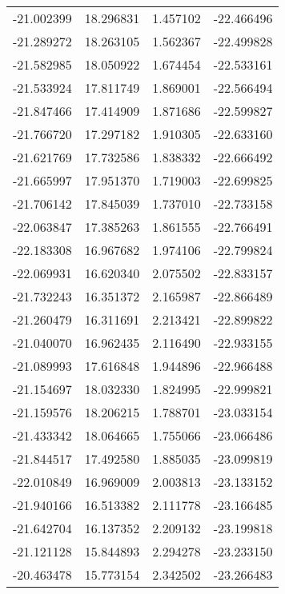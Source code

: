 \begin{tabular}{rrrr}
      -21.002399 &        18.296831 &    1.457102 & -22.466496 \\
      -21.289272 &        18.263105 &    1.562367 & -22.499828 \\
      -21.582985 &        18.050922 &    1.674454 & -22.533161 \\
      -21.533924 &        17.811749 &    1.869001 & -22.566494 \\
      -21.847466 &        17.414909 &    1.871686 & -22.599827 \\
      -21.766720 &        17.297182 &    1.910305 & -22.633160 \\
      -21.621769 &        17.732586 &    1.838332 & -22.666492 \\
      -21.665997 &        17.951370 &    1.719003 & -22.699825 \\
      -21.706142 &        17.845039 &    1.737010 & -22.733158 \\
      -22.063847 &        17.385263 &    1.861555 & -22.766491 \\
      -22.183308 &        16.967682 &    1.974106 & -22.799824 \\
      -22.069931 &        16.620340 &    2.075502 & -22.833157 \\
      -21.732243 &        16.351372 &    2.165987 & -22.866489 \\
      -21.260479 &        16.311691 &    2.213421 & -22.899822 \\
      -21.040070 &        16.962435 &    2.116490 & -22.933155 \\
      -21.089993 &        17.616848 &    1.944896 & -22.966488 \\
      -21.154697 &        18.032330 &    1.824995 & -22.999821 \\
      -21.159576 &        18.206215 &    1.788701 & -23.033154 \\
      -21.433342 &        18.064665 &    1.755066 & -23.066486 \\
      -21.844517 &        17.492580 &    1.885035 & -23.099819 \\
      -22.010849 &        16.969009 &    2.003813 & -23.133152 \\
      -21.940166 &        16.513382 &    2.111778 & -23.166485 \\
      -21.642704 &        16.137352 &    2.209132 & -23.199818 \\
      -21.121128 &        15.844893 &    2.294278 & -23.233150 \\
      -20.463478 &        15.773154 &    2.342502 & -23.266483 \\

\end{tabular}
